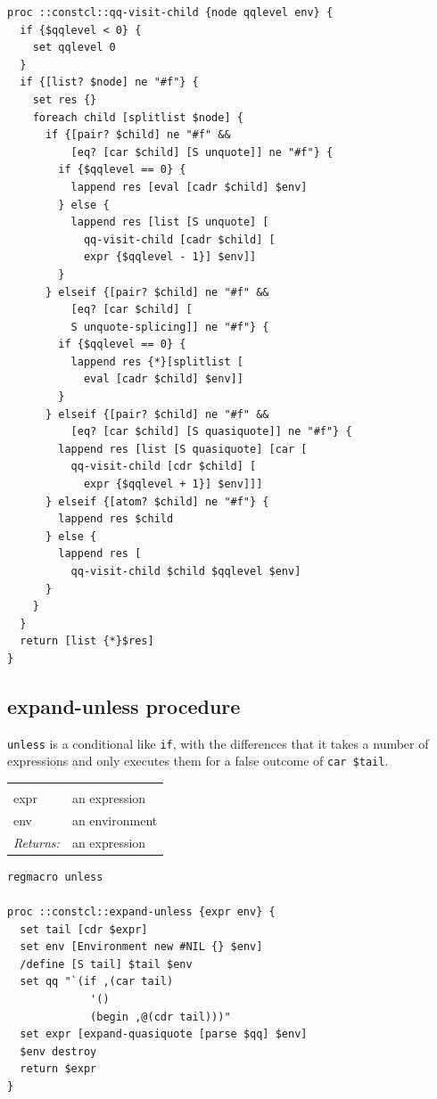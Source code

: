 \documentclass[twoside,9pt]{report}
\begin{document}
\begin{lstlisting}
proc ::constcl::qq-visit-child {node qqlevel env} {
  if {$qqlevel < 0} {
    set qqlevel 0
  }
  if {[list? $node] ne "#f"} {
    set res {}
    foreach child [splitlist $node] {
      if {[pair? $child] ne "#f" &&
          [eq? [car $child] [S unquote]] ne "#f"} {
        if {$qqlevel == 0} {
          lappend res [eval [cadr $child] $env]
        } else {
          lappend res [list [S unquote] [
            qq-visit-child [cadr $child] [
            expr {$qqlevel - 1}] $env]]
        }
      } elseif {[pair? $child] ne "#f" &&
          [eq? [car $child] [
          S unquote-splicing]] ne "#f"} {
        if {$qqlevel == 0} {
          lappend res {*}[splitlist [
            eval [cadr $child] $env]]
        }
      } elseif {[pair? $child] ne "#f" &&
          [eq? [car $child] [S quasiquote]] ne "#f"} {
        lappend res [list [S quasiquote] [car [
          qq-visit-child [cdr $child] [
            expr {$qqlevel + 1}] $env]]] 
      } elseif {[atom? $child] ne "#f"} {
        lappend res $child
      } else {
        lappend res [
          qq-visit-child $child $qqlevel $env]
      }
    }
  }
  return [list {*}$res]
}
\end{lstlisting}
\subsection{expand-unless procedure}
\label{expand-unless-procedure}


\texttt{unless} is a conditional like \texttt{if}, with the differences that it takes a number of expressions and only executes them for a false outcome of \texttt{car \$tail}.

\noindent\begin{tabular}{ |p{1.5cm} p{8cm}| }
\hline
\rowcolor[HTML]{CCCCCC} \multicolumn{2}{|l|}{\bf expand-unless (internal)} \\
expr & an expression \\
env & an environment \\
\textit{Returns:} & an expression \\
\hline
\end{tabular}
\begin{lstlisting}
regmacro unless
 
proc ::constcl::expand-unless {expr env} {
  set tail [cdr $expr]
  set env [Environment new #NIL {} $env]
  /define [S tail] $tail $env
  set qq "`(if ,(car tail)
             '()
             (begin ,@(cdr tail)))"
  set expr [expand-quasiquote [parse $qq] $env]
  $env destroy
  return $expr
}
\end{lstlisting}
\end{document}

